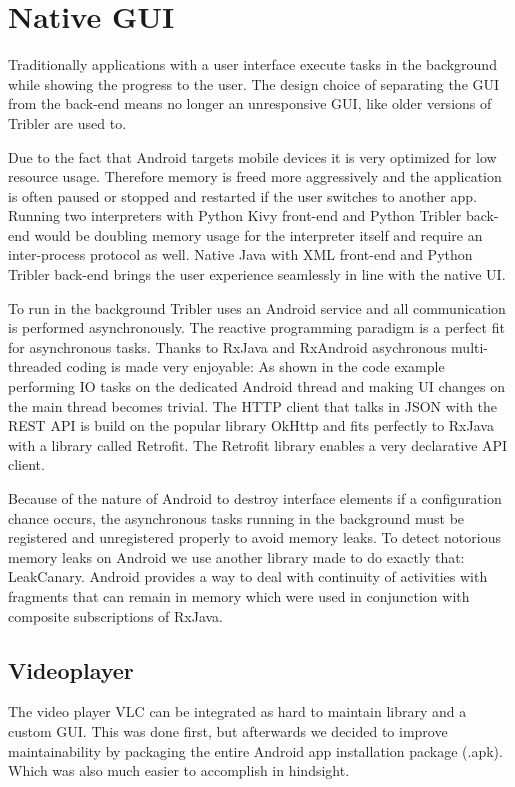 \section{Native GUI}
Traditionally applications with a user interface execute tasks in the background while showing the progress to the user.
The design choice of separating the GUI from the back-end means no longer an unresponsive GUI, like older versions of Tribler are used to.

Due to the fact that Android targets mobile devices it is very optimized for low resource usage.
Therefore memory is freed more aggressively and the application is often paused or stopped and restarted if the user switches to another app.
Running two interpreters with Python Kivy front-end and Python Tribler back-end would be doubling memory usage for the interpreter itself and require an inter-process protocol as well.
Native Java with XML front-end and Python Tribler back-end brings the user experience seamlessly in line with the native UI.

To run in the background Tribler uses an Android service and all communication is performed asynchronously.
The reactive programming paradigm is a perfect fit for asynchronous tasks.
Thanks to RxJava and RxAndroid asychronous multi-threaded coding is made very enjoyable:
As shown in the code example performing IO tasks on the dedicated Android thread and making UI changes on the main thread becomes trivial.
The HTTP client that talks in JSON with the REST API is build on the popular library OkHttp and fits perfectly to RxJava with a library called Retrofit.
The Retrofit library enables a very declarative API client.

Because of the nature of Android to destroy interface elements if a configuration chance occurs, the asynchronous tasks running in the background must be registered and unregistered properly to avoid memory leaks.
To detect notorious memory leaks on Android we use another library made to do exactly that: LeakCanary.
Android provides a way to deal with continuity of activities with fragments that can remain in memory which were used in conjunction with composite subscriptions of RxJava.


\subsection{Videoplayer}
The video player VLC can be integrated as hard to maintain library and a custom GUI.
This was done first, but afterwards we decided to improve maintainability by packaging the entire Android app installation package (.apk).
Which was also much easier to accomplish in hindsight.

